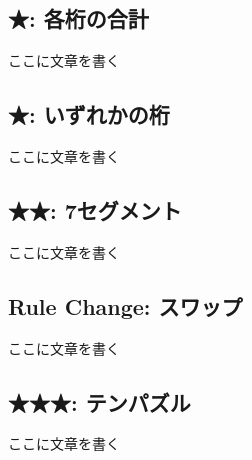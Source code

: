 \documentclass[index]{subfiles}
\begin{document}
  \subsection{★: 各桁の合計}

  ここに文章を書く

  \subsection{★: いずれかの桁}

  ここに文章を書く


  \subsection{★★: 7セグメント}

  ここに文章を書く

  \subsection{Rule Change: スワップ}

  ここに文章を書く

  \subsection{★★★: テンパズル}

  ここに文章を書く
\end{document}
